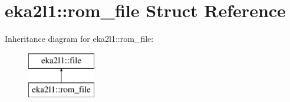 \hypertarget{structeka2l1_1_1rom__file}{}\section{eka2l1\+:\+:rom\+\_\+file Struct Reference}
\label{structeka2l1_1_1rom__file}
Inheritance diagram for eka2l1\+:\+:rom\+\_\+file\+:\begin{figure}[H]
\begin{center}
\leavevmode
\includegraphics[height=2.000000cm]{structeka2l1_1_1rom__file}
\end{center}
\end{figure}
